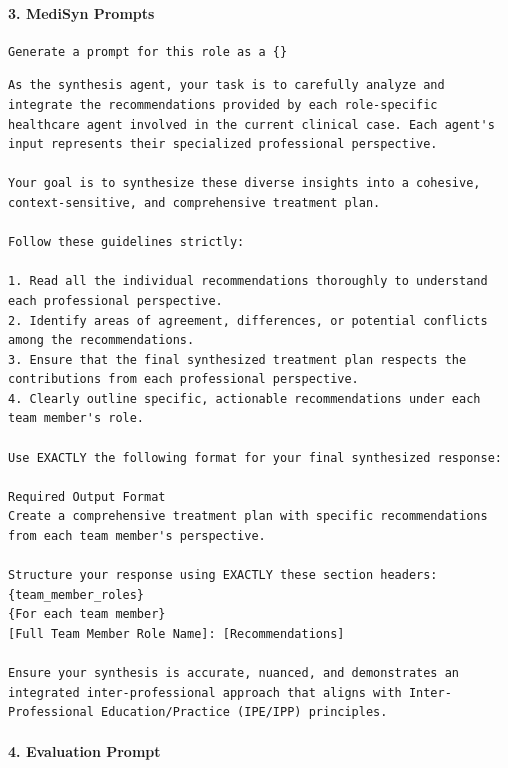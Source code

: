 \documentclass[pdflatex,sn-mathphys-num]{sn-jnl}%
\theoremstyle{thmstyleone}%
\theoremstyle{thmstyletwo}%
\theoremstyle{thmstylethree}%
\begin{document}
\paragraph{3. MediSyn Prompts}

\begin{tcolorbox}[mypromptbox, title={Prompt Generator Prompt}] 
\begin{lstlisting}
Generate a prompt for this role as a {}
\end{lstlisting} 
\end{tcolorbox}

\begin{tcolorbox}[mypromptbox, title={Synthesis Agent Prompt}]
\begin{lstlisting}
As the synthesis agent, your task is to carefully analyze and integrate the recommendations provided by each role-specific healthcare agent involved in the current clinical case. Each agent's input represents their specialized professional perspective.

Your goal is to synthesize these diverse insights into a cohesive, context-sensitive, and comprehensive treatment plan.

Follow these guidelines strictly:

1. Read all the individual recommendations thoroughly to understand each professional perspective.
2. Identify areas of agreement, differences, or potential conflicts among the recommendations.
3. Ensure that the final synthesized treatment plan respects the contributions from each professional perspective.
4. Clearly outline specific, actionable recommendations under each team member's role.

Use EXACTLY the following format for your final synthesized response:

Required Output Format
Create a comprehensive treatment plan with specific recommendations from each team member's perspective.

Structure your response using EXACTLY these section headers:
{team_member_roles}
{For each team member}
[Full Team Member Role Name]: [Recommendations]

Ensure your synthesis is accurate, nuanced, and demonstrates an integrated inter-professional approach that aligns with Inter-Professional Education/Practice (IPE/IPP) principles.
\end{lstlisting}
\end{tcolorbox}


\paragraph{4. Evaluation Prompt}
\end{document}

